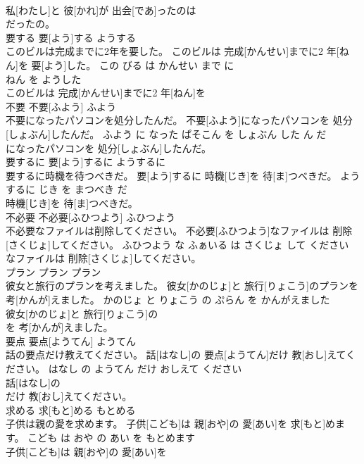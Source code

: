 \documentclass[8pt]{extreport}
\begin{document}
\begin{CJK}{UTF8}{min}
\\	私[わたし]と 彼[かれ]が 出会[であ]ったのは
\\	だったの。			
\\	要する	要[よう]する	ようする	
\\	このビルは完成までに2年を要した。	このビルは 完成[かんせい]までに2 年[ねん]を 要[よう]した。	この びる は かんせい まで に 
\\	ねん を ようした	
\\	このビルは 完成[かんせい]までに2 年[ねん]を
\\	不要	不要[ふよう]	ふよう	
\\	不要になったパソコンを処分したんだ。	不要[ふよう]になったパソコンを 処分[しょぶん]したんだ。	ふよう に なった ぱそこん を しょぶん した ん だ	
\\	になったパソコンを 処分[しょぶん]したんだ。			
\\	要するに	要[よう]するに	ようするに	
\\	要するに時機を待つべきだ。	要[よう]するに 時機[じき]を 待[ま]つべきだ。	ようするに じき を まつべき だ	
\\	時機[じき]を 待[ま]つべきだ。			
\\	不必要	不必要[ふひつよう]	ふひつよう	
\\	不必要なファイルは削除してください。	不必要[ふひつよう]なファイルは 削除[さくじょ]してください。	ふひつよう な ふぁいる は さくじょ して ください	
\\	なファイルは 削除[さくじょ]してください。			
\\	プラン	プラン	プラン	
\\	彼女と旅行のプランを考えました。	彼女[かのじょ]と 旅行[りょこう]のプランを 考[かんが]えました。	かのじょ と りょこう の ぷらん を かんがえました	
\\	彼女[かのじょ]と 旅行[りょこう]の
\\	を 考[かんが]えました。			
\\	要点	要点[ようてん]	ようてん	
\\	話の要点だけ教えてください。	話[はなし]の 要点[ようてん]だけ 教[おし]えてください。	はなし の ようてん だけ おしえて ください	
\\	話[はなし]の
\\	だけ 教[おし]えてください。			
\\	求める	求[もと]める	もとめる	
\\	子供は親の愛を求めます。	子供[こども]は 親[おや]の 愛[あい]を 求[もと]めます。	こども は おや の あい を もとめます	
\\	子供[こども]は 親[おや]の 愛[あい]を

\end{CJK}
\end{document}
